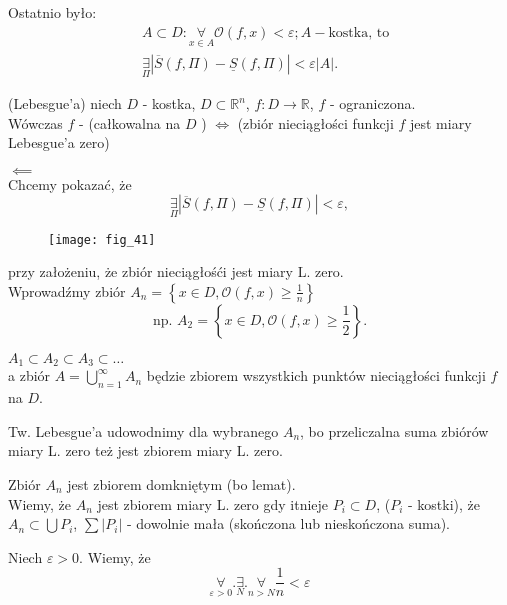 \documentclass[../main.tex]{subfiles}
\begin{document}
    Ostatnio było:
    \begin{align*}
        &A\subset D : \underset{x\in A}{\forall} \mathcal{O}(f,x)<\varepsilon; A - \text{kostka, to}\\
        &\underset{\Pi}{\exists} | \overline{S}(f,\Pi) - \underline{S}(f,\Pi)| < \varepsilon |A|
    .\end{align*}
    \begin{tw}
        (Lebesgue'a) niech $D$ - kostka, $D\subset \mathbb{R}^n$, $f: D\to \mathbb{R}$, $f$ - ograniczona.\\
        Wówczas $f$ - (całkowalna na $D$ ) $\iff$ (zbiór nieciągłości funkcji $f$ jest miary Lebesgue'a zero)
    \end{tw}
    \begin{dowod}
        $\impliedby$ \\
        Chcemy pokazać, że \[
            \underset{\Pi}{\exists} |\overline{S}(f,\Pi) - \underline{S}(f,\Pi) | < \varepsilon
        ,\]
            \begin{figure}[h]
                \centering
                \texttt{[image: fig\_41]}
            \end{figure}
        przy założeniu, że zbiór nieciągłośći jest miary L. zero.\\
        Wprowadźmy zbiór $A_n = \left\{ x\in D, \mathcal{O}(f,x) \ge \frac{1}{n} \right\} $
        \[
            \text{np. } A_2 = \left\{ x\in D, \mathcal{O}(f,x) \ge \frac{1}{2} \right\}
        .\]
        \begin{obserwacja}
            $A_1\subset A_2\subset A_3\subset \ldots$\\
            a zbiór $A = \bigcup_{n=1}^{\infty}A_n$ będzie zbiorem wszystkich punktów nieciągłości funkcji $f$ na  $D$.\\
        \end{obserwacja}
            Tw. Lebesgue'a udowodnimy dla wybranego $A_n$, bo przeliczalna suma zbiórów miary L. zero też jest zbiorem miary L. zero.
        \begin{uwaga}
            Zbiór $A_n$ jest zbiorem domkniętym (bo lemat).\\
            Wiemy, że $A_n$ jest zbiorem miary L. zero gdy itnieje $P_i \subset D$, ($P_i$ - kostki), że $A_n \subset \bigcup P_i $, $\sum |P_i |$ - dowolnie mała (skończona lub nieskończona suma).\\
        \end{uwaga}
        Niech $\varepsilon > 0$. Wiemy, że
        \[
        \underset{\varepsilon>0}{\forall} . \underset{N}{\exists} . \underset{n > N}{\forall} \frac{1}{n} < \varepsilon
\]
\end{dowod}
\end{document}
